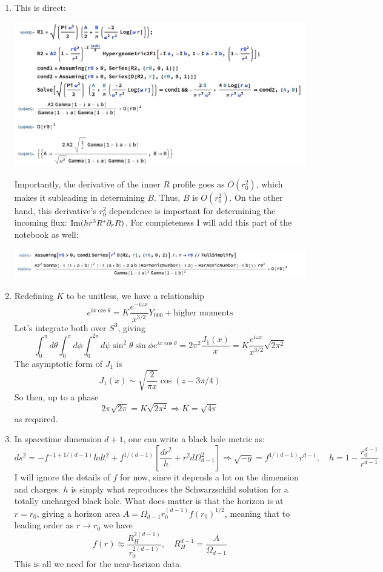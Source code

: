 \documentclass[11pt, class=article, crop=false]{standalone}
\begin{document}
\begin{enumerate}
	\item This is direct:
	\begin{center}
		\includegraphics[scale=0.5]{"Figures/BH Scattering"}
	\end{center}
	Importantly, the derivative of the inner $R$ profile goes as $O(r_0^2)$, which makes it subleading in determining $B$. Thus, $B$ is $O(r_0^2)$. On the other hand, this derivative's $r_0^2$ dependence is important for determining the incoming flux: $\mathrm{Im} (h r^3 R^* \partial_r R)$. For completeness I will add this part of the notebook as well: 
	\begin{center}
		\includegraphics[scale=0.5]{"Figures/BH Scattering 2"}
	\end{center}
	
	\item Redefining $K$ to be unitless, we have a relationship 
	\[
		e^{i x \cos \theta} = K \frac{e^{- i \omega x}}{x^{3/2}} Y_{000} + \text{higher moments}
	\]
	Let's integrate both over $S^3$, giving
	\[
		\int_0^\pi d\theta \int_0^\pi d\phi \int_0^{2\pi} d\psi \sin^2 \theta  \sin \phi e^{i x \cos \theta} = 2 \pi^2 \frac{J_1(x)}{x}  = K \frac{e^{i \omega x}}{x^{3/2}} \sqrt{2 \pi^2}
	\]
	The asymptotic form of $J_1$ is
	\[
		J_1(x) \sim \sqrt{\frac{2}{\pi x}} \cos(z - 3 \pi /4)
	\]
	So then, up to a phase
	\[
		2 \pi \sqrt{2 \pi} = K \sqrt{2 \pi^2} \Rightarrow K = \sqrt{4 \pi}
	\]
	as required. 
	
	\item 
	In spacetime dimension $d+1$, one can write a black hole metric as:
	\[
		ds^2 = - f^{-1+1/(d-1)} h dt^2 + f^{1/(d-1)} \left[\frac{dr^2}{h} + r^2 d \Omega_{d-1}^2 \right] \Rightarrow \sqrt{-g} = f^{1/(d-1)} r^{d-1}, \quad h = 1 - \frac{r_0^{d-1}}{r^{d-1}}
	\]
	I will ignore the details of $f$ for now, since it depends a lot on the dimension and charges. $h$ is simply what reproduces the Schwarzschild solution for a totally uncharged black hole. What does matter is that the horizon is at $r = r_0$, giving a horizon area $A = \Omega_{d-1} r_0^{(d-1)} f(r_0)^{1/2}$, meaning that to leading order as $r \to r_0$ we have
	\[
		f(r) \approx \frac{R_H^{2(d-1)}}{r_0^{2(d-1)}}, \quad R_H^{d-1} = \frac{A}{\Omega_{d-1}}
	\]
	This is all we need for the near-horizon data.
	

\end{enumerate}
\end{document}
